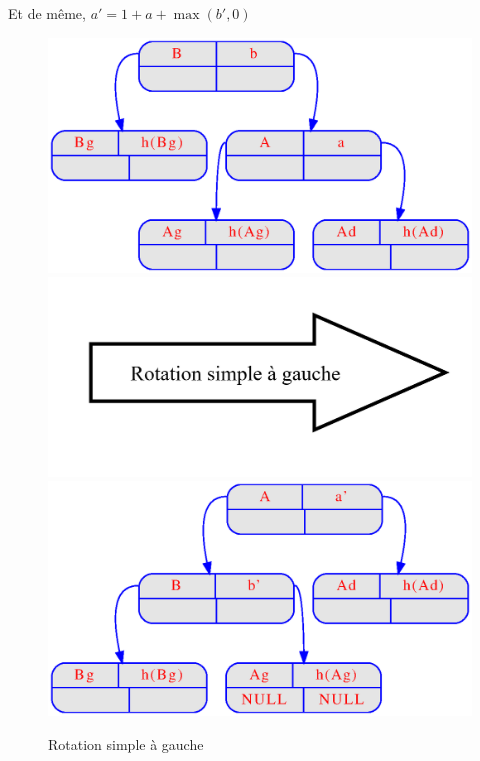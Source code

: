 \documentclass{article} %
\begin{document}
Et de même, \( a' = 1 + a + \max(b', 0) \)

\begin{figure}[!h]
\begin{center}
\includegraphics[scale=0.49]{Img_prog1/LeftRotate1.eps}
\includegraphics[scale=0.20]{Img_prog1/FlecheLeftrotate.png}
\includegraphics[scale=0.49]{Img_prog1/LeftRotate2.eps}
\end{center}

\caption{Rotation simple à gauche}
\label{LeftRot}
\end{figure}
\end{document}
